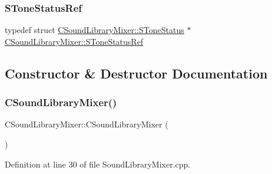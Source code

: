 \hypertarget{classCSoundLibraryMixer_ad772f44e33c3fce7e970b5057bdf81b9}{}\label{classCSoundLibraryMixer_ad772f44e33c3fce7e970b5057bdf81b9} 
\subsubsection{\texorpdfstring{S\+Tone\+Status\+Ref}{SToneStatusRef}}
{\footnotesize\ttfamily typedef  struct \hyperlink{structCSoundLibraryMixer_1_1SToneStatus}{C\+Sound\+Library\+Mixer\+::\+S\+Tone\+Status} $\ast$ \hyperlink{classCSoundLibraryMixer_ad772f44e33c3fce7e970b5057bdf81b9}{C\+Sound\+Library\+Mixer\+::\+S\+Tone\+Status\+Ref}\hspace{0.3cm}{\ttfamily [protected]}}



\subsection{Constructor \& Destructor Documentation}
\hypertarget{classCSoundLibraryMixer_a555dc21fe5bd397e09b524c5f0975a08}{}\label{classCSoundLibraryMixer_a555dc21fe5bd397e09b524c5f0975a08} 
\subsubsection{\texorpdfstring{C\+Sound\+Library\+Mixer()}{CSoundLibraryMixer()}}
{\footnotesize\ttfamily C\+Sound\+Library\+Mixer\+::\+C\+Sound\+Library\+Mixer (\begin{DoxyParamCaption}{ }\end{DoxyParamCaption})}



Definition at line 30 of file Sound\+Library\+Mixer.\+cpp.


